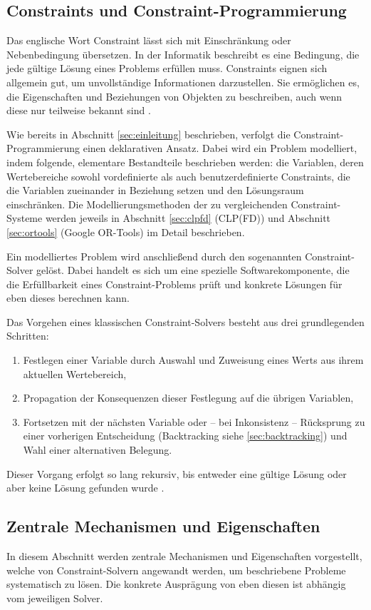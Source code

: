 \documentclass[12pt,a4paper]{article}
\begin{document}
\subsection{Constraints und Constraint-Programmierung}
Das englische Wort \glqq Constraint\grqq{} lässt sich mit Einschränkung oder Nebenbedingung übersetzen.
In der Informatik beschreibt es eine Bedingung, die jede gültige Lösung eines Problems erfüllen muss.
Constraints eignen sich allgemein gut, um unvollständige Informationen darzustellen.
Sie ermöglichen es, die Eigenschaften und Beziehungen von Objekten zu beschreiben, auch wenn diese nur teilweise bekannt sind \cite{clp_book}.

Wie bereits in Abschnitt \ref{sec:einleitung} beschrieben, verfolgt die Constraint-Programmierung einen deklarativen Ansatz.
Dabei wird ein Problem modelliert, indem folgende, elementare Bestandteile beschrieben werden: die Variablen, deren Wertebereiche sowohl vordefinierte als auch benutzerdefinierte Constraints, die die Variablen zueinander in Beziehung setzen und den Lösungsraum einschränken.
Die Modellierungsmethoden der zu vergleichenden Constraint-Systeme werden jeweils in Abschnitt \ref{sec:clpfd} (CLP(FD)) und Abschnitt \ref{sec:ortools} (Google OR-Tools) im Detail beschrieben. 

Ein modelliertes Problem wird anschließend durch den sogenannten Constraint-Solver gelöst.
Dabei handelt es sich um eine spezielle Softwarekomponente, die die Erfüllbarkeit eines Constraint-Problems prüft und konkrete Lösungen für eben dieses berechnen kann.

\noindent
Das Vorgehen eines klassischen Constraint-Solvers besteht aus drei grundlegenden Schritten:
\begin{enumerate}
    \item Festlegen einer Variable durch Auswahl und Zuweisung eines Werts aus ihrem aktuellen Wertebereich,
    \item Propagation der Konsequenzen dieser Festlegung auf die übrigen Variablen,
    \item Fortsetzen mit der nächsten Variable oder -- bei Inkonsistenz -- Rücksprung zu einer vorherigen Entscheidung (Backtracking siehe \ref{sec:backtracking}) und Wahl einer alternativen Belegung.
\end{enumerate}
Dieser Vorgang erfolgt so lang rekursiv, bis entweder eine gültige Lösung oder aber keine Lösung gefunden wurde \cite{clp_book2}.
\subsection{Zentrale Mechanismen und Eigenschaften}
In diesem Abschnitt werden zentrale Mechanismen und Eigenschaften vorgestellt, welche von Constraint-Solvern angewandt werden, um beschriebene Probleme systematisch zu lösen. 
Die konkrete Ausprägung von eben diesen ist abhängig vom jeweiligen Solver.
\end{document}
